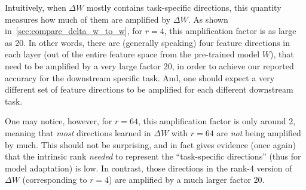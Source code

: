 \documentclass{article} %
\begin{document}
Intuitively, when $\Delta W$ mostly contains task-specific directions, this quantity measures how much of them are amplified by $\Delta W$.
As shown in~\autoref{sec:compare_delta_w_to_w}, for $r=4$, this amplification factor is as large as 20. In other words, there are (generally speaking) four feature directions in each layer (out of the entire feature space from the pre-trained model $W$), that need to be amplified by a very large factor 20, in order to achieve our reported accuracy for the downstream specific task. And, one should expect a very different set of feature directions  to be amplified for each different downstream task.

One may notice, however, for $r=64$, this amplification factor is only around 2, meaning that \emph{most} directions learned in $\Delta W$ with $r=64$ are \emph{not} being amplified by much.
This should not be surprising, and in fact gives evidence (once again) that the intrinsic rank \emph{needed} to represent the ``task-specific directions'' (thus for model adaptation) is low.
In contrast, those directions in the rank-4 version of $\Delta W$ (corresponding to $r=4$) are amplified by a much larger factor 20.
\end{document}
